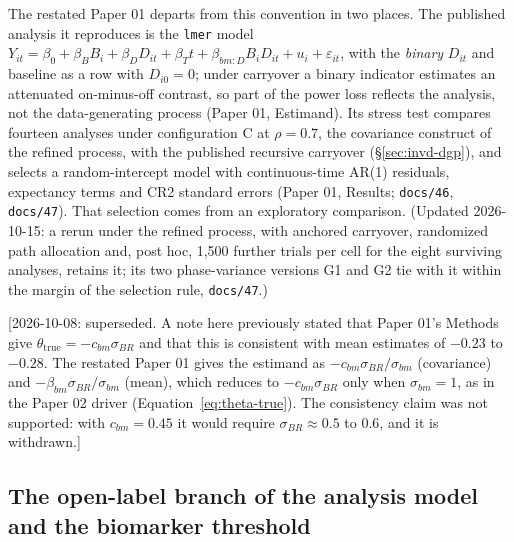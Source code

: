 \documentclass[11pt]{article}
\newcommand{\note}[1]{\textcolor{blue!60!black}{\small [#1]}}
\newcommand{\code}[1]{\texttt{#1}}
\begin{document}
The restated Paper 01 departs from this convention in two places. The
published analysis it reproduces is the \code{lmer} model $Y_{it} =
\beta_0 + \beta_B B_i + \beta_D D_{it} + \beta_T t + \beta_{bm:D} B_i
D_{it} + u_i + \varepsilon_{it}$, with the \emph{binary} $D_{it}$ and
baseline as a row with $D_{i0} = 0$; under carryover a binary
indicator estimates an attenuated on-minus-off contrast, so part of
the power loss reflects the analysis, not the data-generating process
(Paper 01, Estimand). Its stress test compares fourteen analyses under
configuration C at $\rho = 0.7$, the covariance construct of the
refined process, with the published recursive carryover
(\S\ref{sec:invd-dgp}), and selects a random-intercept model with
continuous-time AR(1) residuals, expectancy terms and CR2 standard
errors (Paper 01, Results; \code{docs/46}, \code{docs/47}). That
selection comes from an exploratory comparison. (Updated 2026-10-15: a
rerun under the refined process, with anchored carryover, randomized
path allocation and, post hoc, 1,500 further trials per cell for the
eight surviving analyses, retains it; its two phase-variance versions
G1 and G2 tie with it within the margin of the selection rule,
\code{docs/47}.)

\note{2026-10-08: superseded. A note here previously stated that Paper
01's Methods give $\theta_{\mathrm{true}} = -c_{bm}\sigma_{BR}$ and that
this is consistent with mean estimates of $-0.23$ to $-0.28$. The
restated Paper 01 gives the estimand as $-c_{bm}\sigma_{BR}/\sigma_{bm}$
(covariance) and $-\beta_{bm}\sigma_{BR}/\sigma_{bm}$ (mean), which
reduces to $-c_{bm}\sigma_{BR}$ only when $\sigma_{bm} = 1$, as in the
Paper 02 driver (Equation~\eqref{eq:theta-true}). The consistency claim
was not supported: with $c_{bm} = 0.45$ it would require $\sigma_{BR}
\approx 0.5$ to $0.6$, and it is withdrawn.}

\subsection{The open-label branch of the analysis model and the
biomarker threshold}
\label{sec:inva-olbranch}
\end{document}
